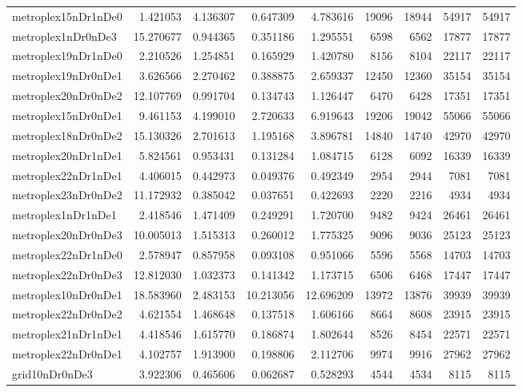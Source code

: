 \begin{longtable}{|l|r|r|r|r|r|r|r|r|}
metroplex15nDr1nDe0 & 1.421053 & 4.136307 & 0.647309 & 4.783616 & 19096 & 18944 & 54917 & 54917 \\
metroplex1nDr0nDe3 & 15.270677 & 0.944365 & 0.351186 & 1.295551 & 6598 & 6562 & 17877 & 17877 \\
metroplex19nDr1nDe0 & 2.210526 & 1.254851 & 0.165929 & 1.420780 & 8156 & 8104 & 22117 & 22117 \\
metroplex19nDr0nDe1 & 3.626566 & 2.270462 & 0.388875 & 2.659337 & 12450 & 12360 & 35154 & 35154 \\
metroplex20nDr0nDe2 & 12.107769 & 0.991704 & 0.134743 & 1.126447 & 6470 & 6428 & 17351 & 17351 \\
metroplex15nDr0nDe1 & 9.461153 & 4.199010 & 2.720633 & 6.919643 & 19206 & 19042 & 55066 & 55066 \\
metroplex18nDr0nDe2 & 15.130326 & 2.701613 & 1.195168 & 3.896781 & 14840 & 14740 & 42970 & 42970 \\
metroplex20nDr1nDe1 & 5.824561 & 0.953431 & 0.131284 & 1.084715 & 6128 & 6092 & 16339 & 16339 \\
metroplex22nDr1nDe1 & 4.406015 & 0.442973 & 0.049376 & 0.492349 & 2954 & 2944 & 7081 & 7081 \\
metroplex23nDr0nDe2 & 11.172932 & 0.385042 & 0.037651 & 0.422693 & 2220 & 2216 & 4934 & 4934 \\
metroplex1nDr1nDe1 & 2.418546 & 1.471409 & 0.249291 & 1.720700 & 9482 & 9424 & 26461 & 26461 \\
metroplex20nDr0nDe3 & 10.005013 & 1.515313 & 0.260012 & 1.775325 & 9096 & 9036 & 25123 & 25123 \\
metroplex22nDr1nDe0 & 2.578947 & 0.857958 & 0.093108 & 0.951066 & 5596 & 5568 & 14703 & 14703 \\
metroplex22nDr0nDe3 & 12.812030 & 1.032373 & 0.141342 & 1.173715 & 6506 & 6468 & 17447 & 17447 \\
metroplex10nDr0nDe1 & 18.583960 & 2.483153 & 10.213056 & 12.696209 & 13972 & 13876 & 39939 & 39939 \\
metroplex22nDr0nDe2 & 4.621554 & 1.468648 & 0.137518 & 1.606166 & 8664 & 8608 & 23915 & 23915 \\
metroplex21nDr1nDe1 & 4.418546 & 1.615770 & 0.186874 & 1.802644 & 8526 & 8454 & 22571 & 22571 \\
metroplex22nDr0nDe1 & 4.102757 & 1.913900 & 0.198806 & 2.112706 & 9974 & 9916 & 27962 & 27962 \\
grid10nDr0nDe3 & 3.922306 & 0.465606 & 0.062687 & 0.528293 & 4544 & 4534 & 8115 & 8115 \\

\end{longtable}
